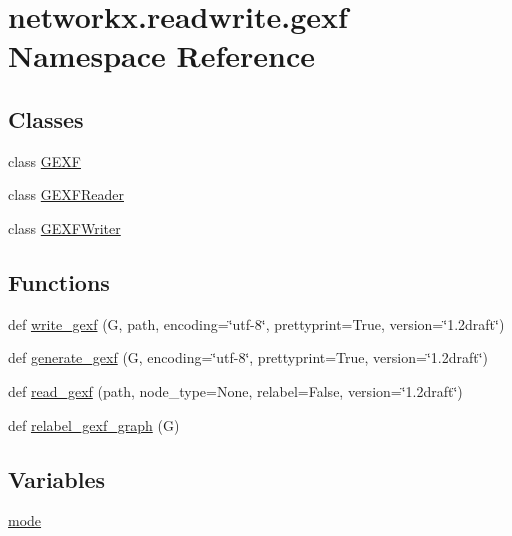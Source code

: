 \hypertarget{namespacenetworkx_1_1readwrite_1_1gexf}{}\section{networkx.\+readwrite.\+gexf Namespace Reference}
\label{namespacenetworkx_1_1readwrite_1_1gexf}
\subsection*{Classes}
\begin{DoxyCompactItemize}
\item 
class \hyperlink{classnetworkx_1_1readwrite_1_1gexf_1_1GEXF}{G\+E\+XF}
\item 
class \hyperlink{classnetworkx_1_1readwrite_1_1gexf_1_1GEXFReader}{G\+E\+X\+F\+Reader}
\item 
class \hyperlink{classnetworkx_1_1readwrite_1_1gexf_1_1GEXFWriter}{G\+E\+X\+F\+Writer}
\end{DoxyCompactItemize}
\subsection*{Functions}
\begin{DoxyCompactItemize}
\item 
def \hyperlink{namespacenetworkx_1_1readwrite_1_1gexf_a845d783cb876a84982ea1eb9707055d9}{write\+\_\+gexf} (G, path, encoding=\char`\"{}utf-\/8\char`\"{}, prettyprint=True, version=\char`\"{}1.\+2draft\char`\"{})
\item 
def \hyperlink{namespacenetworkx_1_1readwrite_1_1gexf_adf0ef4d660c0029b6018d7405bd00bf8}{generate\+\_\+gexf} (G, encoding=\char`\"{}utf-\/8\char`\"{}, prettyprint=True, version=\char`\"{}1.\+2draft\char`\"{})
\item 
def \hyperlink{namespacenetworkx_1_1readwrite_1_1gexf_ae8f41d0374dbed8fa34b57b360c7eea7}{read\+\_\+gexf} (path, node\+\_\+type=None, relabel=False, version=\char`\"{}1.\+2draft\char`\"{})
\item 
def \hyperlink{namespacenetworkx_1_1readwrite_1_1gexf_a5202a23d84be986045b3af98480020e3}{relabel\+\_\+gexf\+\_\+graph} (G)
\end{DoxyCompactItemize}
\subsection*{Variables}
\begin{DoxyCompactItemize}
\item 
\hyperlink{namespacenetworkx_1_1readwrite_1_1gexf_ac603c971d93c75cffd74249147f7b532}{mode}
\end{DoxyCompactItemize}


